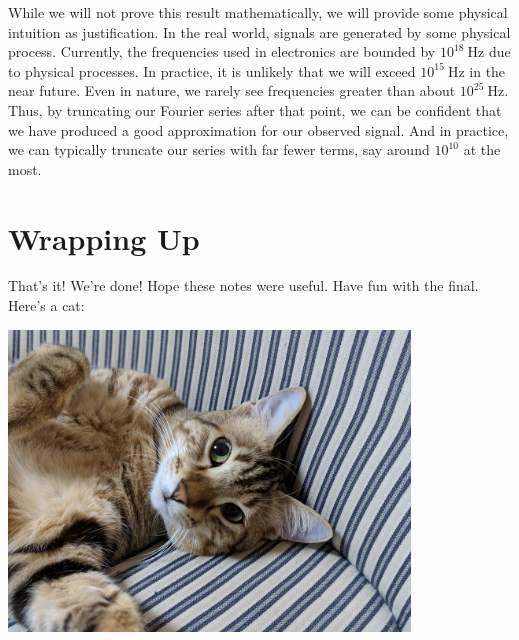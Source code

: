 \documentclass[letterpaper]{article}
\theoremstyle{remark}
\begin{document}
While we will not prove this result mathematically, we will provide some physical intuition as justification. In the real world, signals are generated by some physical process. Currently, the frequencies used in electronics are bounded by $10^{18}\SI{}{\hertz}$ due to physical processes. In practice, it is unlikely that we will exceed $10^{15}\SI{}{\hertz}$ in the near future. Even in nature, we rarely see frequencies greater than about $10^{25} \SI{}{\hertz}$. Thus, by truncating our Fourier series after that point, we can be confident that we have produced a good approximation for our observed signal. And in practice, we can typically truncate our series with far fewer terms, say around $10^{10}$ at the most.

\section{Wrapping Up}
That's it! We're done! Hope these notes were useful. Have fun with the final. Here's a cat:
\begin{center}
\includegraphics[width=0.8\textwidth]{lecture_28/cat.jpg}
\end{center}
\end{document}
